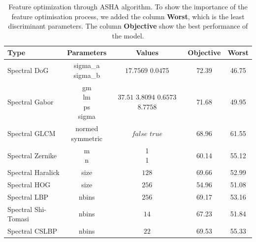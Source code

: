 \documentclass[../thesis.tex]{subfiles}
\begin{document}
    
    \begin{table}[H]
        \centering
        \begin{tabular}{l c c c c}
            \hline
            \textbf{Type} & \textbf{Parameters} & \textbf{Values} & \textbf{Objective} & \textbf{Worst} \\
            \hline
            Spectral DoG &
            \makecell{sigma\_a \\ sigma\_b} &
            \makecell{$17.7569$\\$0.0475$} &
            72.39 &
            46.75\\
            \hline
            Spectral Gabor &
            \makecell{gm\\ lm \\ ps \\ sigma} &
            \makecell{$37.51$ \\$3.8094$ \\$0.6573$ \\$8.7758$} &
            71.68 &
            49.95\\
            \hline
            Spectral GLCM &
            \makecell{normed\\symmetric} &
            \makecell{$false$ \\$true$} &
            68.96 &
            61.55\\
            \hline
            Spectral Zernike &
            \makecell{m\\n} &
            \makecell{1\\1} &
            60.14 &
            55.12\\
            \hline
            Spectral Haralick & size & $128$ & 69.66 & 52.99 \\
            Spectral HOG & size & $256$ & 54.96 & 51.08 \\
            Spectral LBP & nbins & $256$ & 69.17 & 53.16 \\
            Spectral Shi-Tomasi & nbins & $14$ & 67.23 & 51.84 \\
            Spectral CSLBP & nbins & $22$ & 69.53 & 55.33 \\
            \hline
        \end{tabular}
        \caption{Feature optimization through ASHA algorithm. To show the importance of the feature optimisation process, we added the column \textbf{Worst}, which is the least discriminant parameters. The column \textbf{Objective} show the best performance of the model.}
        \label{tab:fv-opti-2}
    \end{table}
    
\end{document}
